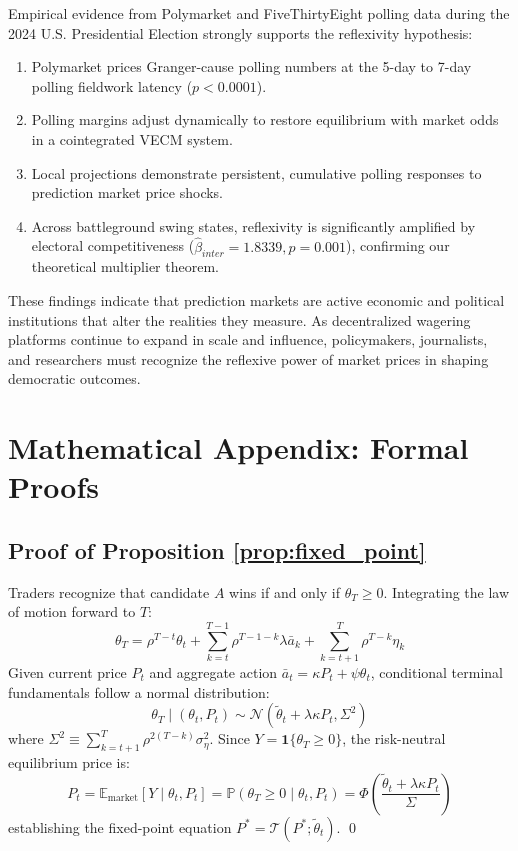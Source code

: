\documentclass[12pt]{article}
\begin{document}
Empirical evidence from Polymarket and FiveThirtyEight polling data during the 2024 U.S. Presidential Election strongly supports the reflexivity hypothesis:
\begin{enumerate}
    \item Polymarket prices Granger-cause polling numbers at the 5-day to 7-day polling fieldwork latency ($p < 0.0001$).
    \item Polling margins adjust dynamically to restore equilibrium with market odds in a cointegrated VECM system.
    \item Local projections demonstrate persistent, cumulative polling responses to prediction market price shocks.
    \item Across battleground swing states, reflexivity is significantly amplified by electoral competitiveness ($\hat{\beta}_{inter} = 1.8339, p = 0.001$), confirming our theoretical multiplier theorem.
\end{enumerate}

These findings indicate that prediction markets are active economic and political institutions that alter the realities they measure. As decentralized wagering platforms continue to expand in scale and influence, policymakers, journalists, and researchers must recognize the reflexive power of market prices in shaping democratic outcomes.

\newpage



\newpage
\appendix
\section{Mathematical Appendix: Formal Proofs}
\label{app:proofs}

\subsection{Proof of Proposition \ref{prop:fixed_point}}
\label{app:proof1}
Traders recognize that candidate $A$ wins if and only if $\theta_T \ge 0$. Integrating the law of motion forward to $T$:
\begin{equation}
\theta_T = \rho^{T-t} \theta_t + \sum_{k=t}^{T-1} \rho^{T-1-k} \lambda \bar{a}_k + \sum_{k=t+1}^T \rho^{T-k} \eta_k
\end{equation}
Given current price $P_t$ and aggregate action $\bar{a}_t = \kappa P_t + \psi \theta_t$, conditional terminal fundamentals follow a normal distribution:
\begin{equation}
\theta_T \mid (\theta_t, P_t) \sim \mathcal{N}\left( \tilde{\theta}_t + \lambda \kappa P_t, \Sigma^2 \right)
\end{equation}
where $\Sigma^2 \equiv \sum_{k=t+1}^T \rho^{2(T-k)} \sigma_\eta^2$. Since $Y = \mathbf{1}\{\theta_T \ge 0\}$, the risk-neutral equilibrium price is:
\begin{equation}
P_t = \mathbb{E}_{\text{market}}[Y \mid \theta_t, P_t] = \mathbb{P}(\theta_T \ge 0 \mid \theta_t, P_t) = \Phi\left( \frac{\tilde{\theta}_t + \lambda \kappa P_t}{\Sigma} \right)
\end{equation}
establishing the fixed-point equation $P^* = \mathcal{T}(P^*; \tilde{\theta}_t)$. \qed
\end{document}
